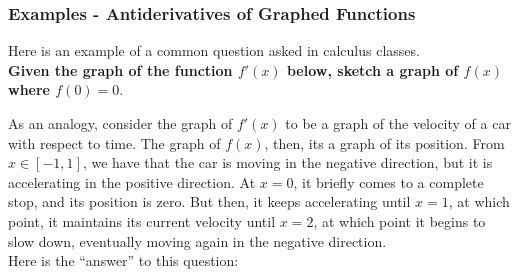 \documentclass[10pt]{article}
\newcommand{\emptyline}[0]{\\\hfill$~$\\}
\begin{document}
\subsubsection{Examples - Antiderivatives of Graphed Functions}
Here is an example of a common question asked in calculus classes. \\
\textbf{Given the graph of the function $f'(x)$ below, sketch a graph of $f(x)$ where $f(0)=0$}. 
\begin{center}
\end{center}
As an analogy, consider the graph of $f'(x)$ to be a graph of the velocity of a car with respect to time. The graph of $f(x)$, then, its a graph of its position. From $x\in[-1,1]$, we have that the car is moving in the negative direction, but it is accelerating in the positive direction. At $x=0$, it briefly comes to a complete stop, and its position is zero. But then, it keeps accelerating until $x=1$, at which point, it maintains its current velocity until $x=2$, at which point it begins to slow down, eventually moving again in the negative direction.\emptyline
Here is the ``answer'' to this question:
\begin{center}
\end{center}
\end{document}
